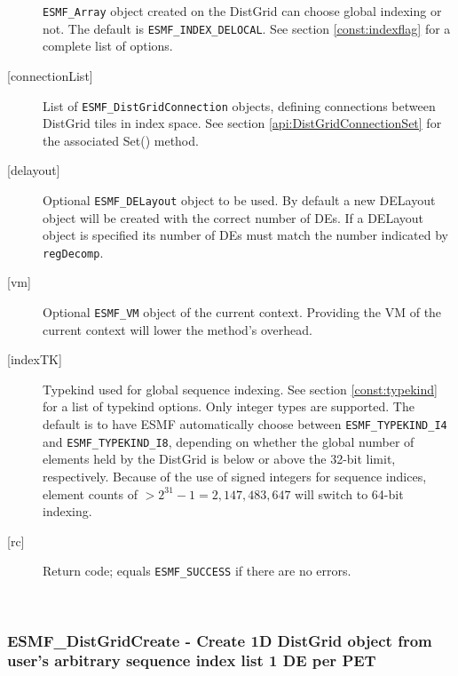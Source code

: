\begin{description}
            {\tt ESMF\_Array} object created on the DistGrid can choose global
            indexing or not. The default is {\tt ESMF\_INDEX\_DELOCAL}.
            See section \ref{const:indexflag} for a complete list of options.
       \item[{[connectionList]}]
            List of {\tt ESMF\_DistGridConnection} objects, defining connections
            between DistGrid tiles in index space.
            See section \ref{api:DistGridConnectionSet} for the associated Set()
            method.
       \item[{[delayout]}]
            Optional {\tt ESMF\_DELayout} object to be used. By default a new
            DELayout object will be created with the correct number of DEs. If
            a DELayout object is specified its number of DEs must match the 
            number indicated by {\tt regDecomp}.
       \item[{[vm]}]
            Optional {\tt ESMF\_VM} object of the current context. Providing the
            VM of the current context will lower the method's overhead.
       \item[{[indexTK]}]
            Typekind used for global sequence indexing. See section 
            \ref{const:typekind} for a list of typekind options. Only integer
            types are supported. The default is to have ESMF automatically choose
            between {\tt ESMF\_TYPEKIND\_I4} and {\tt ESMF\_TYPEKIND\_I8},
            depending on whether the global number of elements held by the
            DistGrid is below or above the 32-bit limit, respectively.
            Because of the use of signed integers for sequence indices, 
            element counts of $ > 2^{31}-1 = 2,147,483,647$ will switch to 64-bit 
            indexing.
       \item[{[rc]}]
            Return code; equals {\tt ESMF\_SUCCESS} if there are no errors.
       \end{description}
   
 
\mbox{}\hrulefill\ 
 
\subsubsection [ESMF\_DistGridCreate] {ESMF\_DistGridCreate - Create 1D DistGrid object from user's arbitrary sequence index list 1 DE per PET}


